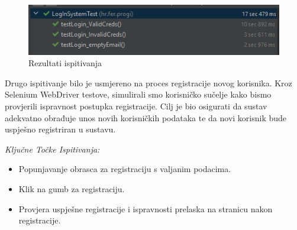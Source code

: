			\begin{figure}[H]
				\includegraphics[scale=1]{slike/loginTests.png} 
				\centering
				\caption{Rezultati ispitivanja}
				\label{fig:promjene}
			\end{figure}
			
			Drugo ispitivanje bilo je usmjereno na proces registracije novog korisnika. Kroz Selenium WebDriver testove, simulirali smo korisničko sučelje kako bismo provjerili ispravnost postupka registracije. Cilj je bio osigurati da sustav adekvatno obrađuje unos novih korisničkih podataka te da novi korisnik bude uspješno registriran u sustavu.
			
			\textit{Ključne Točke Ispitivanja:}
			\begin{itemize}
				\item Popunjavanje obrasca za registraciju s valjanim podacima.
				\item Klik na gumb za registraciju.
				\item Provjera uspješne registracije i ispravnosti prelaska na stranicu nakon registracije.
			\end{itemize}
			
